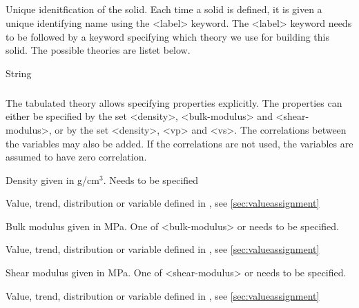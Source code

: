 {\subparagraph{}
 \slist
   \item \Description Unique idenitfication of the solid. Each time a solid is defined, it is given a unique identifying name using
the <label> keyword. The <label> keyword needs to be followed by a keyword specifying which theory we use for building this solid. The possible theories are listet below. 
   \item \Argument String
   \item \Default 
 \elist

\subparagraph{}
 \slist
   \item \Description The tabulated theory allows specifying properties explicitly. The properties can either be specified by the set <density>, <bulk-modulus> and <shear-modulus>, or by the set <density>, <vp> and <vs>. The correlations between the variables may also be added. If the correlations are not used, the variables are assumed to have zero correlation. 
   \item \Argument
   \item \Default 
 \elist

 \slist
   \item \Description Density given in g/cm$^3$. Needs to be specified
   \item \Argument Value, trend, distribution or variable defined in , see \autoref{sec:valueassignment}
   \item \Default 
 \elist

 \slist
   \item \Description Bulk modulus given in MPa. One of <bulk-modulus> or  needs to be specified.
   \item \Argument Value, trend, distribution or variable defined in , see \autoref{sec:valueassignment}
   \item \Default 
 \elist

 \slist
   \item \Description Shear modulus given in MPa. One of <shear-modulus> or  needs to be specified.
   \item \Argument Value, trend, distribution or variable defined in , see \autoref{sec:valueassignment}
   \item \Default 
 \elist

}
